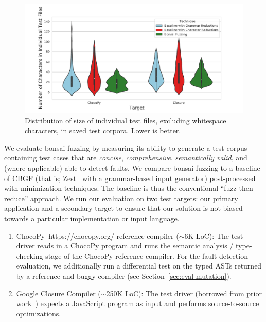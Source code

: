 \documentclass[conference]{IEEEtran}
\newcommand{\tech}{bonsai fuzzing} \newcommand{\Tech}{Bonsai fuzzing} \newcommand{\TECH}{Bonsai Fuzzing}
\begin{document}
\begin{figure}[ht]
    \centering
    \includegraphics[scale=0.5]{violin_chocopy.pdf}
    \caption{Distribution of size of individual test files, excluding whitespace characters, in saved test corpora. Lower is better.}
    \label{fig:test-size-violin}
\end{figure}
We evaluate \tech{} by measuring its ability to generate a test corpus containing test cases that are \textit{concise}, \textit{comprehensive}, \textit{semantically valid}, and (where applicable) able to detect faults. We compare \tech{} to a baseline of CBGF (that is; Zest~\cite{Padhye19-zest} with a grammar-based input generator) post-processed with minimization techniques. The baseline is thus the conventional ``fuzz-then-reduce'' approach. We run our evaluation on two test targets: our primary application and a secondary target to ensure that our solution is not biased towards a particular implementation or input language.

\noindent
\begin{enumerate}
    \item ChocoPy~https://chocopy.org/ reference compiler ($\sim$6K LoC): The test driver reads in a ChocoPy program and runs the semantic analysis / type-checking stage of the ChocoPy reference compiler. For the fault-detection evaluation, we additionally run a differential test on the typed ASTs returned by a reference and buggy compiler (see Section~\ref{sec:eval-mutation}).
    \item Google Closure Compiler\cite{Closure} ($\sim$250K LoC): The test driver (borrowed from prior work~\cite{Padhye19-zest}) expects a JavaScript program as input and performs source-to-source optimizations.
\end{enumerate}
\end{document}

